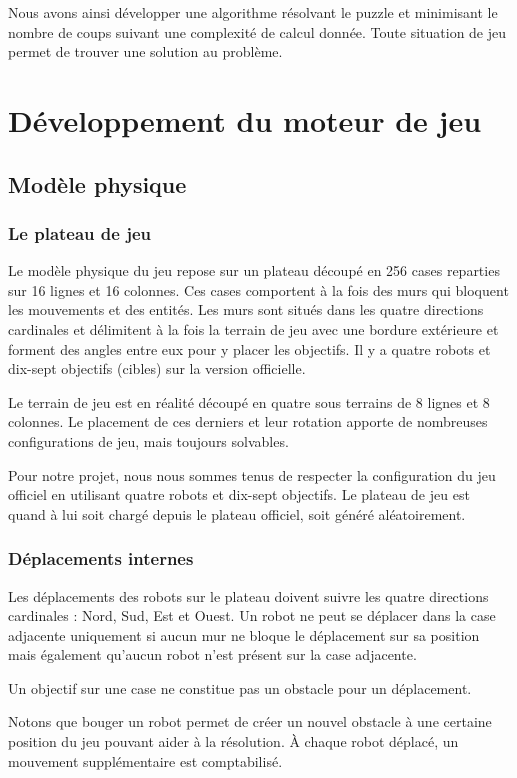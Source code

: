 \documentclass[a4paper]{article} %
\begin{document}
Nous avons ainsi développer une algorithme résolvant le puzzle et minimisant le nombre de coups suivant une complexité de calcul donnée. Toute situation de jeu permet de trouver une solution au problème.

\section{Développement du moteur de jeu}
	\subsection{Modèle physique}
		\subsubsection{Le plateau de jeu}
Le modèle physique du jeu repose sur un plateau découpé en 256 cases reparties sur 16 lignes et 16 colonnes. Ces cases comportent à la fois des murs qui bloquent les mouvements et des entités.
Les murs sont situés dans les quatre directions cardinales et délimitent à la fois la terrain de jeu avec une bordure extérieure et forment des angles entre eux pour y placer les objectifs.
Il y a quatre robots et dix-sept objectifs (cibles) sur la version officielle.

Le terrain de jeu est en réalité découpé en quatre sous terrains de 8 lignes et 8 colonnes. Le placement de ces derniers et leur rotation apporte de nombreuses configurations de jeu, mais toujours solvables.

Pour notre projet, nous nous sommes tenus de respecter la configuration du jeu officiel en utilisant quatre robots et dix-sept objectifs. Le plateau de jeu est quand à lui soit chargé depuis le plateau officiel, soit généré aléatoirement.

		\subsubsection{Déplacements internes}
Les déplacements des robots sur le plateau doivent suivre les quatre directions cardinales : Nord, Sud, Est et Ouest. Un robot ne peut se déplacer dans la case adjacente uniquement si aucun mur ne bloque le déplacement sur sa position mais également qu'aucun robot n'est présent sur la case adjacente.

Un objectif sur une case ne constitue pas un obstacle pour un déplacement.

Notons que bouger un robot permet de créer un nouvel obstacle à une certaine position du jeu pouvant aider à la résolution. À chaque robot déplacé, un mouvement supplémentaire est comptabilisé.
\end{document}
